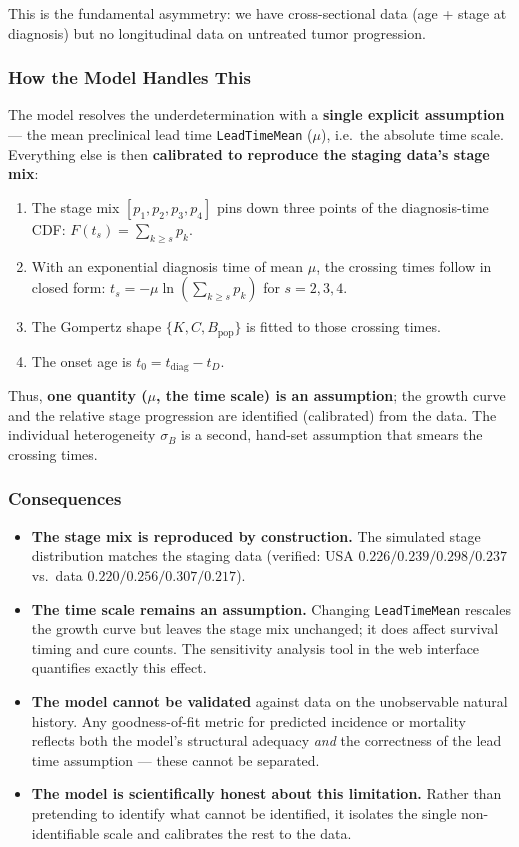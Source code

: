 \documentclass[12pt,a4paper]{article}
\begin{document}
This is the fundamental asymmetry: we have cross-sectional data (age + stage at diagnosis) but no longitudinal data on untreated tumor progression.

\subsubsection{How the Model Handles This}

The model resolves the underdetermination with a \textbf{single explicit assumption} — the mean preclinical lead time \texttt{LeadTimeMean} ($\mu$), i.e.\ the absolute time scale. Everything else is then \textbf{calibrated to reproduce the staging data's stage mix}:

\begin{enumerate}[nosep]
    \item The stage mix $[p_1,p_2,p_3,p_4]$ pins down three points of the diagnosis-time CDF: $F(t_s) = \sum_{k \ge s} p_k$.
    \item With an exponential diagnosis time of mean $\mu$, the crossing times follow in closed form: $t_s = -\mu \ln\!\left(\sum_{k \ge s} p_k\right)$ for $s = 2, 3, 4$.
    \item The Gompertz shape $\{K, C, B_{\text{pop}}\}$ is fitted to those crossing times.
    \item The onset age is $t_0 = t_{\text{diag}} - t_D$.
\end{enumerate}

Thus, \textbf{one quantity ($\mu$, the time scale) is an assumption}; the growth curve and the relative stage progression are identified (calibrated) from the data. The individual heterogeneity $\sigma_B$ is a second, hand-set assumption that smears the crossing times.

\subsubsection{Consequences}

\begin{itemize}[nosep]
    \item \textbf{The stage mix is reproduced by construction.} The simulated stage distribution matches the staging data (verified: USA $0.226/0.239/0.298/0.237$ vs.\ data $0.220/0.256/0.307/0.217$).
    \item \textbf{The time scale remains an assumption.} Changing \texttt{LeadTimeMean} rescales the growth curve but leaves the stage mix unchanged; it does affect survival timing and cure counts. The sensitivity analysis tool in the web interface quantifies exactly this effect.
    \item \textbf{The model cannot be validated} against data on the unobservable natural history. Any goodness-of-fit metric for predicted incidence or mortality reflects both the model's structural adequacy \textit{and} the correctness of the lead time assumption — these cannot be separated.
    \item \textbf{The model is scientifically honest about this limitation.} Rather than pretending to identify what cannot be identified, it isolates the single non-identifiable scale and calibrates the rest to the data.
\end{itemize}
\end{document}
